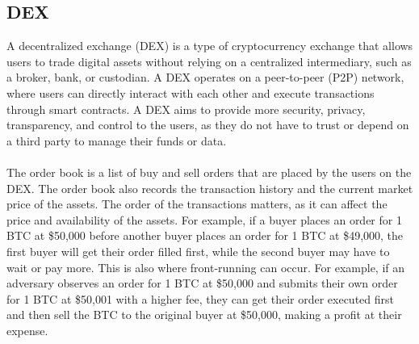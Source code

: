 \subsection{DEX}
A decentralized exchange (DEX) is a type of cryptocurrency exchange that allows users to trade digital assets without relying on a centralized intermediary, such as a broker, bank, or custodian. A DEX operates on a peer-to-peer (P2P) network, where users can directly interact with each other and execute transactions through smart contracts. A DEX aims to provide more security, privacy, transparency, and control to the users, as they do not have to trust or depend on a third party to manage their funds or data.\\\\
The order book is a list of buy and sell orders that are placed by the users on the DEX. The order book also records the transaction history and the current market price of the assets. The order of the transactions matters, as it can affect the price and availability of the assets. For example, if a buyer places an order for 1 BTC at \$50,000 before another buyer places an order for 1 BTC at \$49,000, the first buyer will get their order filled first, while the second buyer may have to wait or pay more. This is also where front-running can occur. For example, if an adversary observes an order for 1 BTC at \$50,000 and submits their own order for 1 BTC at \$50,001 with a higher fee, they can get their order executed first and then sell the BTC to the original buyer at \$50,000, making a profit at their expense.

